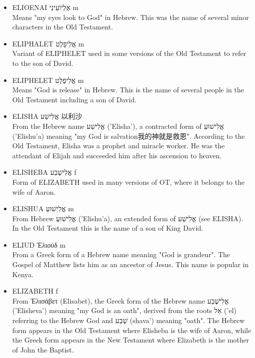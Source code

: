 \begin{itemize}
\item {ELIOENAI אֶלְיוֹעֵינַי m}\\
Means "my eyes look to God" in Hebrew. This was the name of several minor characters in the Old Testament.

\item {ELIPHALET אֱלִיפָלֶט m}\\
Variant of ELIPHELET used in some versions of the Old Testament to refer to the son of David.

\item {ELIPHELET אֱלִיפֶלֶט m}\\
Means "God is release" in Hebrew. This is the name of several people in the Old Testament including a son of David.


\item {ELISHA אֱלִישַׁע 以利沙}\\
From the Hebrew name אֱלִישַׁע ('Elisha'), a contracted form of אֱלִישׁוּעַ ('Elishu'a) meaning "my God is salvation我的神就是救恩". According to the Old Testament, Elisha was a prophet and miracle worker. He was the attendant of Elijah and succeeded him after his ascension to heaven.

\item {ELISHEBA אֱלִישֶׁבַע f}\\
Form of ELIZABETH used in many versions of OT, where it belongs to the wife of Aaron.

\item {ELISHUA אֱלִישׁוּעַ m}\\
From Hebrew אֱלִישׁוּעַ ('Elishu'a), an extended form of אֱלִישַׁע (see ELISHA). In the Old Testament this is the name of a son of King David.

\item {ELIUD Ἐλιούδ m}\\
From a Greek form of a Hebrew name meaning "God is grandeur". The Gospel of Matthew lists him as an ancestor of Jesus. This name is popular in Kenya.

\item {ELIZABETH f}\\
From Ἐλισάβετ (Elisabet), the Greek form of the Hebrew name אֱלִישֶׁבַע ('Elisheva') meaning "my God is an oath", derived from the roots אֵל ('el) referring to the Hebrew God and שָׁבַע (shava') meaning "oath". The Hebrew form appears in the Old Testament where Elisheba is the wife of Aaron, while the Greek form appears in the New Testament where Elizabeth is the mother of John the Baptist.


\end{itemize}
